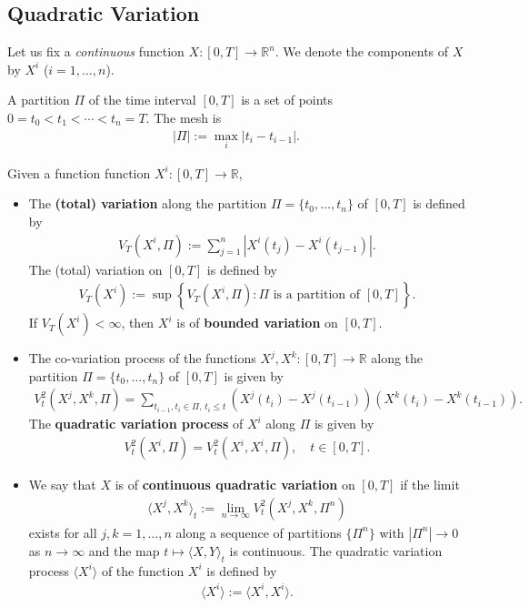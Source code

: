 \subsection{Quadratic Variation}

Let us fix a \emph{continuous} function $X : [0,T] \rightarrow \mathbb{R}^n$. We denote the components of $X$ by $X^i$ ($i = 1, \dots, n$).

\begin{definition}[Partition]
	A partition $\Pi$ of the time interval $[0,T]$ is a set of points $0 = t_0 < t_1 < \cdots < t_n = T$. The mesh is
	\begin{align*}
		|\Pi| := \max_i |t_i - t_{i-1}|.
	\end{align*}
\end{definition}

\begin{definition}
	Given a function function $X^i : [0,T] \rightarrow \mathbb{R}$, 
	\begin{itemize}
		\item The \textbf{(total) variation} along the partition $\Pi = \{t_0, \dots, t_n\}$ of $[0,T]$ is defined by
		\begin{align*}
			V_T(X^i, \Pi) := \sum_{j=1}^n |X^i(t_j) - X^i(t_{j-1})|.
		\end{align*}
		The (total) variation on $[0,T]$ is defined by
		\begin{align*}
			V_T(X^i) := \sup \left\{ V_T(X^i, \Pi) : \Pi \text{ is a partition of } [0,T] \right\}.
		\end{align*}
		If $V_T(X^i) < \infty$, then $X^i$ is of \textbf{bounded variation} on $[0,T]$.
		\item The co-variation process of the functions $X^j, X^k : [0,T] \rightarrow \mathbb{R}$ along the partition $\Pi = \{t_0, \dots, t_n\}$ of $[0,T]$ is given by
		\begin{align*}
			V_t^2(X^j, X^k, \Pi) = \sum_{t_{i-1}, t_i \in \Pi,\, t_i \le t} \left( X^j(t_i) - X^j(t_{i-1}) \right)\left( X^k(t_i) - X^k(t_{i-1}) \right).
		\end{align*}
		The \textbf{quadratic variation process} of $X^i$ along $\Pi$ is given by
		\begin{align*}
			V_t^2(X^i, \Pi) = V_t^2(X^i, X^i, \Pi), \quad t \in [0,T].
		\end{align*}
		\item We say that $X$ is of \textbf{continuous quadratic variation} on $[0,T]$ if the limit
		\begin{align*}
			\langle X^j, X^k \rangle_t := \lim_{n \rightarrow \infty} V_t^2(X^j, X^k, \Pi^n)
		\end{align*}
		exists for all $j, k = 1, \dots, n$ along a sequence of partitions $\{\Pi^n\}$ with $|\Pi^n| \rightarrow 0$ as $n \rightarrow \infty$ and the map $t \mapsto \langle X, Y \rangle_t$ is continuous. The quadratic variation process $\langle X^i \rangle$ of the function $X^i$ is defined by
		\begin{align*}
			\langle X^i \rangle := \langle X^i, X^i \rangle.
		\end{align*}
	\end{itemize}
\end{definition}

